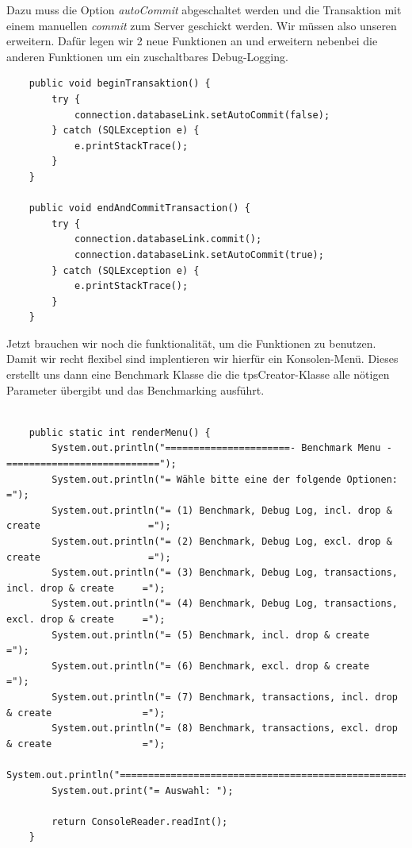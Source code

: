 Dazu muss die Option \textit{autoCommit} abgeschaltet werden und die Transaktion
mit einem manuellen \textit{commit} zum Server geschickt werden. Wir müssen also
unseren  erweitern. Dafür legen wir 2 neue Funktionen an und
erweitern nebenbei die anderen Funktionen um ein zuschaltbares Debug-Logging.


\clearpage
\begin{lstlisting}
	public void beginTransaktion() {
		try {
			connection.databaseLink.setAutoCommit(false);
		} catch (SQLException e) {
			e.printStackTrace();
		}
	}
	
	public void endAndCommitTransaction() {
		try {
			connection.databaseLink.commit();
			connection.databaseLink.setAutoCommit(true);
		} catch (SQLException e) {
			e.printStackTrace();
		}
	}
\end{lstlisting}


Jetzt brauchen wir noch die funktionalität, um die Funktionen zu benutzen. Damit
wir recht flexibel sind implentieren wir hierfür ein Konsolen-Menü. Dieses
erstellt uns dann eine Benchmark Klasse die die tpsCreator-Klasse alle nötigen
Parameter übergibt und das Benchmarking ausführt.\\

\begin{lstlisting}

	public static int renderMenu() {
		System.out.println("======================- Benchmark Menu -===========================");
		System.out.println("= Wähle bitte eine der folgende Optionen:                         =");
		System.out.println("= (1) Benchmark, Debug Log, incl. drop & create                   =");
		System.out.println("= (2) Benchmark, Debug Log, excl. drop & create                   =");
		System.out.println("= (3) Benchmark, Debug Log, transactions, incl. drop & create     =");
		System.out.println("= (4) Benchmark, Debug Log, transactions, excl. drop & create     =");
		System.out.println("= (5) Benchmark, incl. drop & create                              =");
		System.out.println("= (6) Benchmark, excl. drop & create                              =");
		System.out.println("= (7) Benchmark, transactions, incl. drop & create                =");
		System.out.println("= (8) Benchmark, transactions, excl. drop & create                =");
		System.out.println("===================================================================");
		System.out.print("= Auswahl: ");
		
		return ConsoleReader.readInt();
	}
\end{lstlisting}

